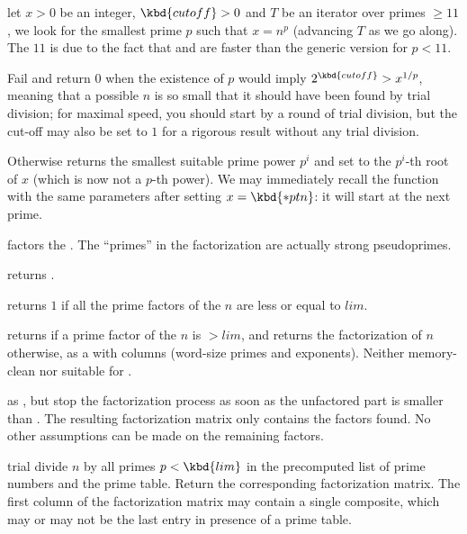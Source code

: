 let $x > 0$ be an integer, $\kbd{cutoff} > 0$ and $T$ be an iterator over
primes $\geq 11$, we look for the smallest prime $p$ such that $x = n^p$
(advancing $T$ as we go along). The $11$ is due to the fact that
 and  are faster than the generic version for
$p < 11$.

Fail and return $0$ when the existence of $p$ would imply $2^{\kbd{cutoff}} >
x^{1/p}$, meaning that a possible $n$ is so small that it should have been
found by trial division; for maximal speed, you should start by a round of
trial division, but the cut-off may also be set to $1$ for a rigorous result
without any trial division.

Otherwise returns the smallest suitable prime power $p^i$ and set 
to the $p^i$-th root of $x$ (which is now not a $p$-th power). We may
immediately recall the function with the same parameters after setting $x =
\kbd{*ptn}$: it will start at the next prime.


 factors the  . The ``primes''
in the factorization are actually strong pseudoprimes.

 returns .

 returns $1$ if all the
prime factors of the  $n$ are less or equal to $lim$.

 returns  if a prime
factor of the  $n$ is $> lim$, and returns the factorization
of $n$ otherwise, as a  with  columns (word-size
primes and exponents). Neither memory-clean nor suitable for
.

 as , but stop the
factorization process as soon as the unfactored part is smaller than .
The resulting factorization matrix only contains the factors found. No other
assumptions can be made on the remaining factors.

 trial divide $n$ by all primes $p
< \kbd{lim}$ in the precomputed list of prime numbers and the 
prime table. Return the corresponding factorization matrix. The first column
of the factorization matrix may contain a single composite, which may
or may not be the last entry in presence of a prime table.

